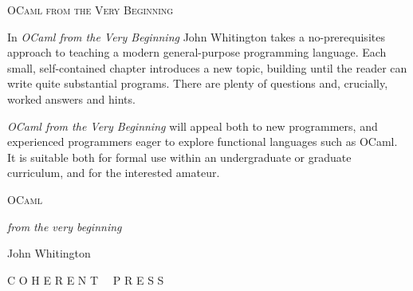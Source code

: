 \documentclass[]{book}
\begin{document}
\frontmatter

\thispagestyle{empty}

{\Large\scshape OCaml from the Very Beginning}

\vspace{16mm}

\begin{minipage}{5in}
\setlength{\parindent}{25pt}
\noindent In \textit{OCaml from the Very Beginning} John Whitington takes a no-prerequisites approach to teaching a modern general-purpose programming language. Each small, self-contained chapter introduces a new topic, building until the reader can write quite substantial programs. There are plenty of questions and, crucially, worked answers and hints.

\textit{OCaml from the Very Beginning} will appeal both to new programmers, and experienced programmers eager to explore functional languages such as OCaml. It is suitable both for formal use within an undergraduate or graduate curriculum, and for the interested amateur.

\vspace{8mm}

\end{minipage}

\cleardoublepage %

\thispagestyle{empty}

\begin{center}
\vphantom{a}%

\vspace{50mm}

{\Huge\scshape OCaml

\textit{\LARGE from the very beginning}

}

\vspace{20mm}

{John Whitington}

\vspace{85mm}

{\scshape C O H E R E N T \ \ P R E S S}
\end{center}

\clearpage
\end{document}
